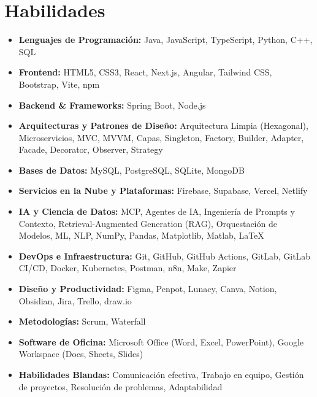 \documentclass[letterpaper,12pt]{fed-res} %
\begin{document}
\section{Habilidades}
\begin{itemize}[leftmargin=0.15in, label={}]
    \item \textbf{Lenguajes de Programación:} Java, JavaScript, TypeScript, Python, C++, SQL
    \item \textbf{Frontend:} HTML5, CSS3, React, Next.js, Angular, Tailwind CSS, Bootstrap, Vite, npm
    \item \textbf{Backend \& Frameworks:} Spring Boot, Node.js
    \item \textbf{Arquitecturas y Patrones de Diseño:} Arquitectura Limpia (Hexagonal), Microservicios, MVC, MVVM, Capas, Singleton, Factory, Builder, Adapter, Facade, Decorator, Observer, Strategy
    \item \textbf{Bases de Datos:} MySQL, PostgreSQL, SQLite, MongoDB
    \item \textbf{Servicios en la Nube y Plataformas:} Firebase, Supabase, Vercel, Netlify
    \item \textbf{IA y Ciencia de Datos:} MCP, Agentes de IA, Ingeniería de Prompts y Contexto, Retrieval-Augmented Generation (RAG), Orquestación de Modelos, ML, NLP, NumPy, Pandas, Matplotlib, Matlab, \LaTeX
    \item \textbf{DevOps e Infraestructura:} Git, GitHub, GitHub Actions, GitLab, GitLab CI/CD, Docker, Kubernetes, Postman, n8n, Make, Zapier
    \item \textbf{Diseño y Productividad:} Figma, Penpot, Lunacy, Canva, Notion, Obsidian, Jira, Trello, draw.io
    \item \textbf{Metodologías:} Scrum, Waterfall
    \item \textbf{Software de Oficina:} Microsoft Office (Word, Excel, PowerPoint), Google Workspace (Docs, Sheets, Slides)
    \item \textbf{Habilidades Blandas:} Comunicación efectiva, Trabajo en equipo, Gestión de proyectos, Resolución de problemas, Adaptabilidad
\end{itemize}

\end{document}
